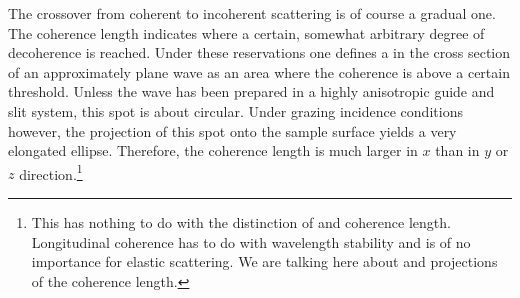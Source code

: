 The crossover from coherent to incoherent scattering is of course
a gradual one.
The coherence length indicates where a certain, somewhat arbitrary degree
of decoherence is reached.
Under these reservations
one defines a 
in the cross section of an approximately plane wave
as an area where the coherence is above a certain threshold.
Unless the wave has been prepared in a highly anisotropic guide and slit system,
this spot is about circular.
Under grazing incidence conditions however,
the projection of this spot onto the sample surface
yields a very elongated ellipse.
Therefore, the coherence length is much larger in $x$ than
in $y$ or $z$ direction.\footnote
{This has nothing to do with the distinction of
   and  coherence length.
  Longitudinal coherence has to do with wavelength stability
  and is of no importance for elastic scattering.
  We are talking here about  and 
  projections of the  coherence length.}



%
